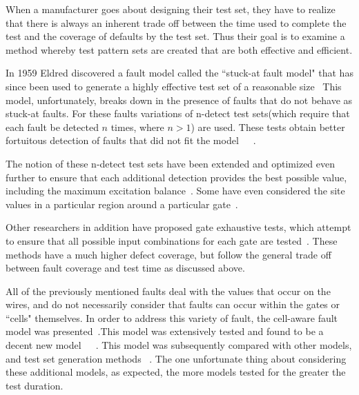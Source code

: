 \documentclass[10 pt, technote]{IEEEtran}
\begin{document}
%

	When a manufacturer goes about designing their test set, they have to realize that there is always an inherent trade off between the time used to complete the test and the coverage of defaults by the test set. Thus their goal is to examine a method whereby test pattern sets are created that are both effective and efficient. 
	
	In 1959 Eldred discovered a fault model called the ``stuck-at fault model" that has since been used to generate a highly effective test set of a reasonable size~\cite{Eldred:1959:TRB:320954.320957} This model, unfortunately, breaks down in the presence of faults that do not behave as stuck-at faults. For these faults variations of n-detect test sets(which require that each fault be detected $n$ times, where $n > 1$) are used. These tests obtain better fortuitous detection of faults that did not fit the model~\cite{529895}~\cite{766662}~\cite{923462}.
	
	The notion of these n-detect test sets have been extended and optimized even further to ensure that each additional detection provides the best possible value, including the maximum excitation balance~\cite{Dworak:2004:BEE:968879.969191}. Some have even considered the site values in a particular region around a particular gate~\cite{Dwarakanath:2000:UFS:337292.337779}. 
	
	Other researchers in addition have proposed gate exhaustive tests, which attempt to ensure that all possible input combinations for each gate are tested~\cite{894222}. These methods have a much higher defect coverage, but follow the general trade off between fault coverage and test time as discussed above. 
	
	All of the previously mentioned faults deal with the values that occur on the wires, and do not necessarily consider that faults can occur within the gates or ``cells" themselves. In order to address this variety of fault, the cell-aware fault model was presented~\cite{6233046}.This model was extensively tested and found to be a decent new model~\cite{6673230}~\cite{6401533}~\cite{5783604}. This model was subsequently compared with other models, and test set generation methods ~\cite{5355741}. The one unfortunate thing about considering these additional models, as expected, the more models tested for the greater the test duration. 
	
\end{document}
